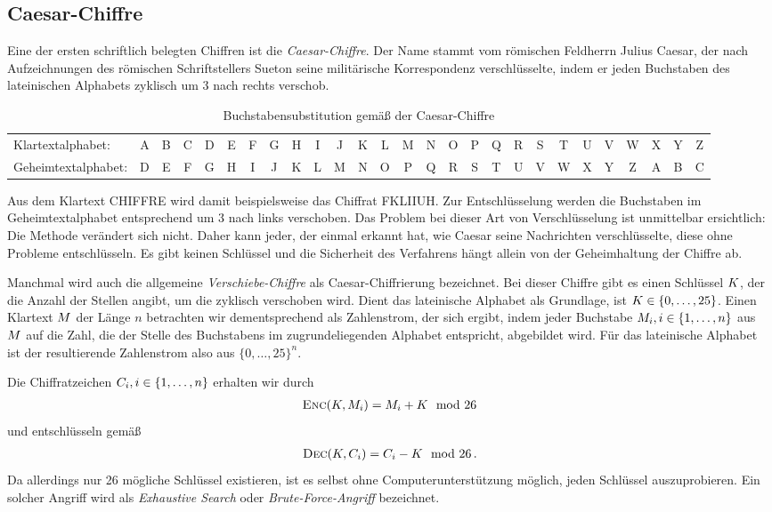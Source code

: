 \subsection{Caesar-Chiffre}
Eine der ersten schriftlich belegten Chiffren ist die
\emph{Caesar-Chiffre}\indexCaesar. Der Name stammt vom römischen
Feldherrn Julius Caesar, der nach Aufzeichnungen des römischen
Schriftstellers Sueton seine militärische Korrespondenz verschlüsselte,
indem er jeden Buchstaben des lateinischen Alphabets zyklisch um 3 nach
rechts verschob. 
\begin{table}[h]
	\centering
	\setlength{\tabcolsep}{2pt}
	\begin{tabular}{l*{26}{c}}
		Klartextalphabet: &A&B&C&D&E&F&G&H&I&J&K&L&M&N&O&P&Q&R&S&T&U&V&W&X&Y&Z\\
		Geheimtextalphabet: &D&E&F&G&H&I&J&K&L&M&N&O&P&Q&R&S&T&U&V&W&X&Y&Z&A&B&C\\
	\end{tabular}
	\caption{Buchstabensubstitution gemäß der Caesar-Chiffre}
\end{table}

Aus dem Klartext \glqq CHIFFRE\grqq{} wird damit beispielsweise das
Chiffrat \glqq FKLIIUH\grqq. Zur Entschlüsselung werden die Buchstaben
im Geheimtextalphabet entsprechend um 3 nach links verschoben. Das
Problem bei dieser Art von Verschlüsselung ist unmittelbar ersichtlich:
Die Methode verändert sich nicht. Daher kann jeder, der einmal erkannt
hat, wie Caesar seine Nachrichten verschlüsselte, diese ohne Probleme
entschlüsseln. Es gibt keinen Schlüssel und die Sicherheit des
Verfahrens hängt allein von der Geheimhaltung der Chiffre ab. 

Manchmal wird auch die allgemeine \emph{Verschiebe-Chiffre} als
Caesar-Chiffrierung bezeichnet. Bei dieser Chiffre gibt es einen
Schlüssel $K$, der die Anzahl der Stellen angibt, um die zyklisch
verschoben wird. Dient das lateinische Alphabet als Grundlage, ist $K
\in \{0,\dots,25\}$. Einen Klartext $M$ der Länge $n$ betrachten
wir dementsprechend als Zahlenstrom, der sich ergibt, indem jeder
Buchstabe $M_{i}, i \in \{1,\dots,n\}$ aus $M$ auf die Zahl,
die der Stelle des Buchstabens im zugrundeliegenden Alphabet entspricht,
abgebildet wird. Für das lateinische Alphabet ist der resultierende
Zahlenstrom also aus $\{0,\dots,25\}^{n}$.

Die Chiffratzeichen $C_{i}, i \in \{1,\dots,n\}$ erhalten wir durch 
\begin{align*}
  \textsc{Enc}(K, M_i) = M_i + K \mod 26
\end{align*}
und entschlüsseln gemäß
\begin{align*}
  \textsc{Dec}(K, C_i) = C_i - K \mod 26\, .
\end{align*}
Da allerdings nur 26 mögliche Schlüssel existieren, ist es selbst ohne
Computerunterstützung möglich, jeden Schlüssel auszuprobieren. Ein
solcher Angriff wird als \emph{Exhaustive Search} oder
\emph{Brute-Force-Angriff} \indexBruteForce bezeichnet. 

